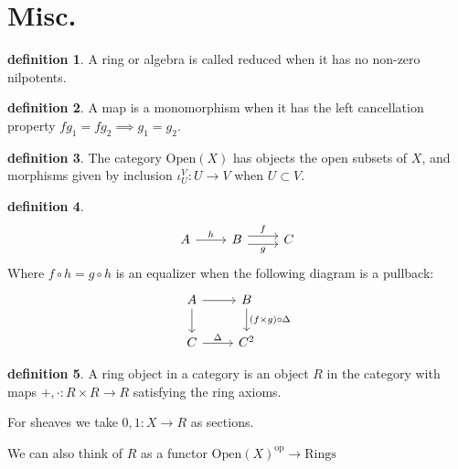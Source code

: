\documentclass[10.5pt]{article}
\theoremstyle{definition}
\newtheorem{definition}{definition}
\begin{document}
    \section{Misc.}
    \begin{definition}
        A ring or algebra is called reduced when it has no non-zero nilpotents.
    \end{definition}
    \begin{definition}
        A map is a monomorphism when it has the left cancellation property \(fg_1 = fg_2 \implies g_1 = g_2\).
    \end{definition}
    \begin{definition}\label{OpenX def}
        The category \(\text{Open}(X)\) has objects the open subsets of \(X\), and morphisms given by inclusion \(\iota_U^V: U \to V\) when \(U \subset V\).
    \end{definition}
    \begin{definition}\label{equalizer defn}
        \begin{equation*}
            \begin{tikzcd}
                A \ar[r, "h"]
                &B \ar[r,shift left=.75ex,"f"]
                \ar[r,shift right=.75ex,swap,"g"]
                &C
            \end{tikzcd}
        \end{equation*}
        Where \(f \circ h = g\circ h\) is an equalizer when the following diagram is a pullback:
        \begin{equation*}
            \begin{tikzcd}
                A \arrow[r] \arrow[d,""] &B \arrow[d,"(f \times g)\circ \Delta"] \\ C \arrow[r,"\Delta"] & C^2
            \end{tikzcd} 
        \end{equation*}
    \end{definition}
    \begin{definition}
        A ring object in a category is an object \(R\) in the category with maps \(+,\cdot: R\times R \to R\) satisfying the ring axioms.

        For sheaves we take \(0,1: X \to R\) as sections.

        We can also think of \(R\) as a functor \(\text{Open}(X)^{\text{op}} \to \text{Rings}\)
    \end{definition}
\end{document}
